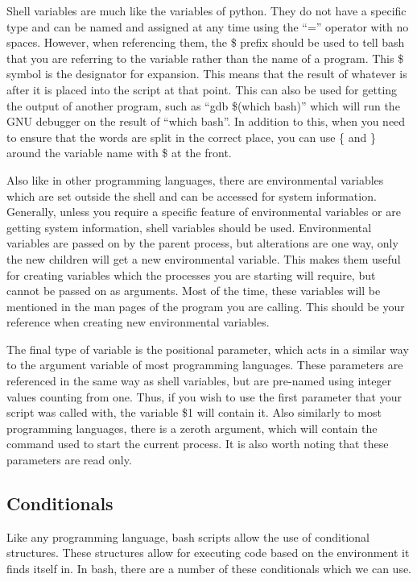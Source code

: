 			Shell variables are much like the variables of python. 
			They do not have a specific type and can be named and assigned at any time using the ``='' operator with no spaces.
			However, when referencing them, the \$ prefix should be used to tell bash that you are referring to the variable rather than the name of a program.
			This \$ symbol is the designator for expansion. 
			This means that the result of whatever is after it is placed into the script at that point. 
			This can also be used for getting the output of another program, such as ``gdb \$(which bash)'' which will run the GNU debugger on the result of ``which bash''. 
			In addition to this, when you need to ensure that the words are split in the correct place, you can use \{ and \} around the variable name with \$ at the front. 

			Also like in other programming languages, there are environmental variables which are set outside the shell and can be accessed for system information. 
			Generally, unless you require a specific feature of environmental variables or are getting system information, shell variables should be used. 
			Environmental variables are passed on by the parent process, but alterations are one way, only the new children will get a new environmental variable. 
			This makes them useful for creating variables which the processes you are starting will require, but cannot be passed on as arguments. 
			Most of the time, these variables will be mentioned in the man pages of the program you are calling. 
			This should be your reference when creating new environmental variables. 

			The final type of variable is the positional parameter, which acts in a similar way to the argument variable of most programming languages. 
			These parameters are referenced in the same way as shell variables, but are pre-named using integer values counting from one. 
			Thus, if you wish to use the first parameter that your script was called with, the variable \$1 will contain it. 
			Also similarly to most programming languages, there is a zeroth argument, which will contain the command used to start the current process. 
			It is also worth noting that these parameters are read only. 


		\subsection{Conditionals}
			Like any programming language, bash scripts allow the use of conditional structures. 
			These structures allow for executing code based on the environment it finds itself in. 
			In bash, there are a number of these conditionals which we can use. 

